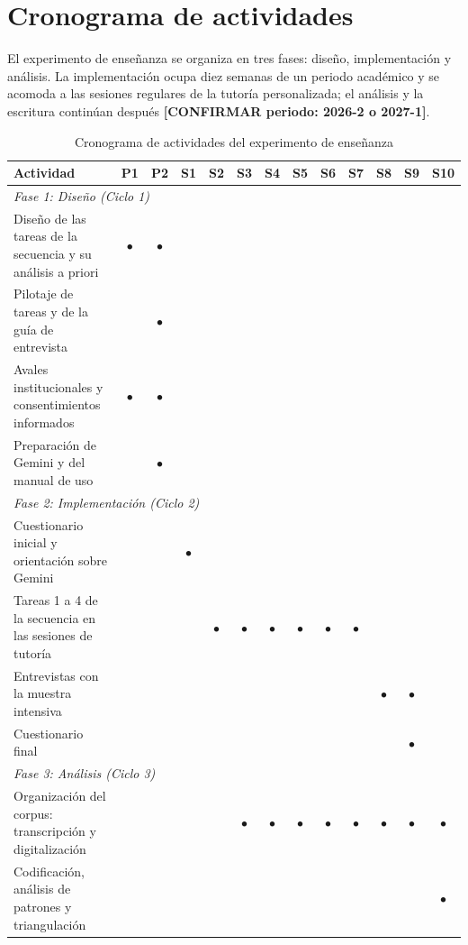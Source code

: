 \section{Cronograma de actividades}
\label{sec:cronograma}

El experimento de enseñanza se organiza en tres fases: diseño, implementación y análisis. La implementación ocupa diez semanas de un periodo académico y se acomoda a las sesiones regulares de la tutoría personalizada; el análisis y la escritura continúan después \textbf{[CONFIRMAR periodo: 2026-2 o 2027-1]}.

\begin{table}[H]
\centering
\caption{Cronograma de actividades del experimento de enseñanza}
\label{tab:cronograma}
\small
\begin{tabular}{|p{5.5cm}|c|c|c|c|c|c|c|c|c|c|c|c|}
\hline
\textbf{Actividad} & \textbf{P1} & \textbf{P2} & \textbf{S1} & \textbf{S2} & \textbf{S3} & \textbf{S4} & \textbf{S5} & \textbf{S6} & \textbf{S7} & \textbf{S8} & \textbf{S9} & \textbf{S10} \\
\hline
\multicolumn{13}{|l|}{\textit{Fase 1: Diseño (Ciclo 1)}} \\
\hline
Diseño de las tareas de la secuencia y su análisis a priori & $\bullet$ & $\bullet$ & & & & & & & & & & \\
\hline
Pilotaje de tareas y de la guía de entrevista & & $\bullet$ & & & & & & & & & & \\
\hline
Avales institucionales y consentimientos informados & $\bullet$ & $\bullet$ & & & & & & & & & & \\
\hline
Preparación de Gemini y del manual de uso & & $\bullet$ & & & & & & & & & & \\
\hline
\multicolumn{13}{|l|}{\textit{Fase 2: Implementación (Ciclo 2)}} \\
\hline
Cuestionario inicial y orientación sobre Gemini & & & $\bullet$ & & & & & & & & & \\
\hline
Tareas 1 a 4 de la secuencia en las sesiones de tutoría & & & & $\bullet$ & $\bullet$ & $\bullet$ & $\bullet$ & $\bullet$ & $\bullet$ & & & \\
\hline
Entrevistas con la muestra intensiva & & & & & & & & & & $\bullet$ & $\bullet$ & \\
\hline
Cuestionario final & & & & & & & & & & & $\bullet$ & \\
\hline
\multicolumn{13}{|l|}{\textit{Fase 3: Análisis (Ciclo 3)}} \\
\hline
Organización del corpus: transcripción y digitalización & & & & & $\bullet$ & $\bullet$ & $\bullet$ & $\bullet$ & $\bullet$ & $\bullet$ & $\bullet$ & $\bullet$ \\
\hline
Codificación, análisis de patrones y triangulación & & & & & & & & & & & & $\bullet$ \\
\hline
\end{tabular}
\end{table}

